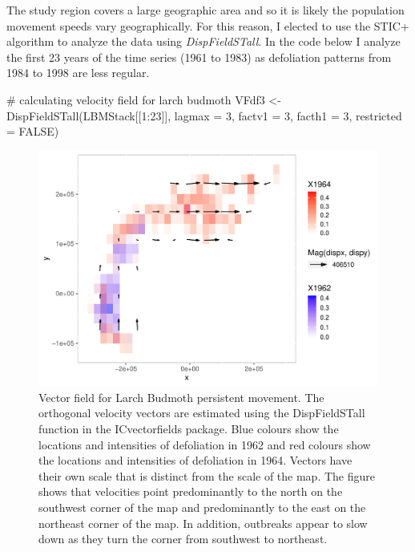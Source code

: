 The study region covers a large geographic area and so it is likely the
population movement speeds vary geographically. For this reason, I
elected to use the STIC+ algorithm to analyze the data using
\emph{DispFieldSTall}. In the code below I analyze the first 23 years of
the time series (1961 to 1983) as defoliation patterns from 1984 to 1998
are less regular.

\begin{Schunk}
\begin{Sinput}
# calculating velocity field for larch budmoth
VFdf3 <- DispFieldSTall(LBMStack[[1:23]], lagmax = 3, factv1 = 3, facth1 = 3, restricted = FALSE)
\end{Sinput}
\end{Schunk}

\begin{Schunk}
\begin{figure}
\includegraphics{ImageCorrelationVFv2_files/figure-latex/5-1} \caption[Vector field for Larch Budmoth persistent movement]{Vector field for Larch Budmoth persistent movement. The orthogonal velocity vectors are estimated using the DispFieldSTall function in the ICvectorfields package. Blue colours show the locations and intensities of defoliation in 1962 and red colours show the locations and intensities of defoliation in 1964. Vectors have their own scale that is distinct from the scale of the map. The figure shows that velocities point predominantly to the north on the southwest corner of the map and predominantly to the east on the northeast corner of the map. In addition, outbreaks appear to slow down as they turn the corner from southwest to northeast.}\label{fig:5}
\end{figure}
\end{Schunk}

